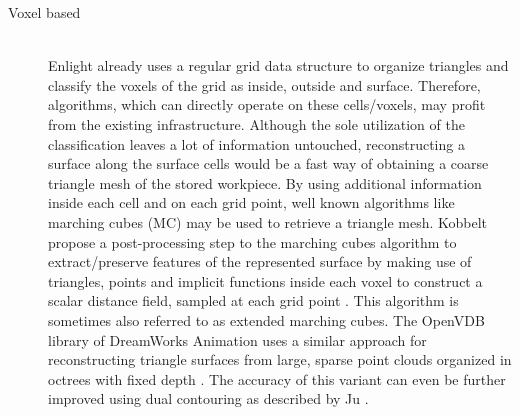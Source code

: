 \begin{description}
	\item[Voxel based] \hfill \\
	Enlight already uses a regular grid data structure to organize triangles and classify the voxels of the grid as inside, outside and surface.
	Therefore, algorithms, which can directly operate on these cells/voxels, may profit from the existing infrastructure.
	Although the sole utilization of the classification leaves a lot of information untouched, reconstructing a surface along the surface cells would be a fast way of obtaining a coarse triangle mesh of the stored workpiece.
	By using additional information inside each cell and on each grid point, well known algorithms like marching cubes (MC) may be used to retrieve a triangle mesh.
	Kobbelt \etal propose a post-processing step to the marching cubes algorithm to extract/preserve features of the represented surface by making use of triangles, points and implicit functions inside each voxel to construct a scalar distance field, sampled at each grid point \cite{extended_marching_cubes}.
	This algorithm is sometimes also referred to as extended marching cubes.
	The OpenVDB library of DreamWorks Animation uses a similar approach for reconstructing triangle surfaces from large, sparse point clouds organized in octrees with fixed depth \cite{openvdb}.
	The accuracy of this variant can even be further improved using dual contouring as described by Ju \etal \cite{dual_contouring}.
\end{description}
